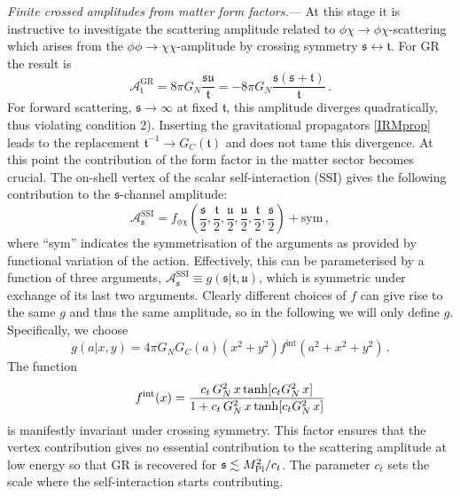 \documentclass[aps,prl,onecolumn,superscriptaddress,longbibliography,nofootinbib,floatfix,showpacs,12pt]{revtex4-1}
\newcommand{\GR}{{\small GR}}
\newcommand{\be}{\begin{equation}}
\newcommand{\ee}{\end{equation}}
\newcommand{\mans}{\ensuremath{\mathfrak{s}}}
\newcommand{\mant}{\ensuremath{\mathfrak{t}}}
\newcommand{\manu}{\ensuremath{\mathfrak{u}}}
\begin{document}
\textit{Finite crossed amplitudes from matter form factors.}---
At this stage it is instructive to investigate the scattering amplitude related to $\phi\chi \rightarrow \phi\chi$-scattering which arises from the $\phi\phi \rightarrow \chi\chi$-amplitude by crossing symmetry $\mans \leftrightarrow \mant$.
For GR the result is
%
\be\label{crossedscatteringGR}
\mathcal A_\mant^{\text{GR}} = 8 \pi G_N  \frac{\mans \manu}{\mant} = - 8\pi G_N \frac{\mans(\mans+\mant)}{\mant} \, . 
\ee
%
For forward scattering, $\mans \rightarrow \infty$ at fixed $\mant$, this amplitude diverges quadratically, thus violating condition 2).
Inserting the gravitational propagators \eqref{IRMprop} leads to the replacement $\mant^{-1} \rightarrow G_C(\mant)$ and does not tame this divergence.
At this point the contribution of the form factor in the matter sector becomes crucial.
The on-shell vertex of the scalar self-interaction ({\small{SSI}}) gives the following contribution to the $\mans{}$-channel amplitude:
%
	\begin{equation}\label{matterff1}
\mathcal A_\mans^\text{SSI} = f_{\phi\chi}\left(\frac{\mans}{2},\frac{\mant}{2},\frac{\manu}{2},\frac{\manu}{2},\frac{\mant}{2},\frac{\mans}{2}\right) + \text{sym} \, ,
\end{equation}
%
where ``sym'' indicates the symmetrisation of the arguments as provided by functional variation of the action. Effectively, this can be parameterised by a function of three arguments,
%
$\mathcal A_\mans^\text{SSI} \equiv g(\mans|\mant,\manu)$,
%
which is symmetric under exchange of its last two arguments. Clearly different choices of $f$ can give rise to the same $g$ and thus the same amplitude, so in the following we will only define $g$. Specifically, we choose
%
\begin{equation}\label{matterpara}
g(a|x,y) = 4\pi G_N G_C(a) (x^2+y^2) f^{\text{int}}(a^2+x^2+y^2) \, .
\end{equation}
%
The function
%
\be
f^{\rm int}(x) =  \frac{c_t \, G_N^2 \, x \tanh[c_t G_N^2 \, x]}{1 + c_t \, G_N^2 \, x \tanh[c_t G_N^2 \, x]}
\ee
%
is manifestly invariant under crossing symmetry.
This factor ensures that the vertex contribution gives no essential contribution to the scattering amplitude at low energy so that \GR{} is recovered for $\mans \lesssim M_{\rm Pl}^2/c_t$.
The parameter $c_t$  sets the scale where the self-interaction starts contributing.
\end{document}
